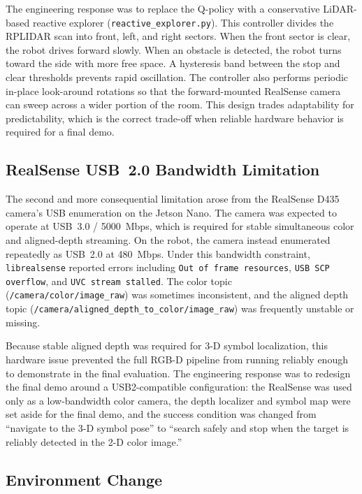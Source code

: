 \documentclass[letterpaper, 10 pt, conference]{ieeeconf/ieeeconf}
\begin{document}
The engineering response was to replace the Q-policy with a conservative
LiDAR-based reactive explorer (\texttt{reactive\_explorer.py}).
This controller divides the RPLIDAR scan into front, left, and right sectors.
When the front sector is clear, the robot drives forward slowly.
When an obstacle is detected, the robot turns toward the side with more free
space.
A hysteresis band between the stop and clear thresholds prevents rapid
oscillation.
The controller also performs periodic in-place look-around rotations so that
the forward-mounted RealSense camera can sweep across a wider portion of the
room.
This design trades adaptability for predictability, which is the correct
trade-off when reliable hardware behavior is required for a final demo.

\subsection{RealSense USB~2.0 Bandwidth Limitation}

The second and more consequential limitation arose from the RealSense D435
camera's USB enumeration on the Jetson Nano.
The camera was expected to operate at USB~3.0 / 5000~Mbps, which is required
for stable simultaneous color and aligned-depth streaming.
On the robot, the camera instead enumerated repeatedly as USB~2.0 at 480~Mbps.
Under this bandwidth constraint, \texttt{librealsense} reported errors including
\texttt{Out of frame resources}, \texttt{USB SCP overflow}, and
\texttt{UVC stream stalled}.
The color topic (\texttt{/camera/color/image\_raw}) was sometimes inconsistent,
and the aligned depth topic
(\texttt{/camera/aligned\_depth\_to\_color/image\_raw}) was frequently unstable
or missing.

Because stable aligned depth was required for 3-D symbol localization,
this hardware issue prevented the full RGB-D pipeline from running
reliably enough to demonstrate in the final evaluation.
The engineering response was to redesign the final demo around a
USB2-compatible configuration: the RealSense was used only as a low-bandwidth
color camera, the depth localizer and symbol map were set aside for the final
demo, and the success condition was changed from ``navigate to the 3-D symbol
pose'' to ``search safely and stop when the target is reliably detected in
the 2-D color image.''

\subsection{Environment Change}
\end{document}
